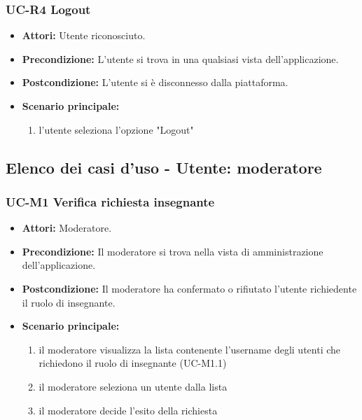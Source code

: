 \subsubsection{UC-R4 Logout}
\begin{itemize}
		\item \textbf{Attori:} Utente riconosciuto.
		\item \textbf{Precondizione:} L'utente si trova in una qualsiasi vista dell'applicazione.
		\item \textbf{Postcondizione:} L'utente si è disconnesso dalla piattaforma.
		\item \textbf{Scenario principale:}
		\begin{enumerate}
			\item l'utente seleziona l'opzione "Logout"
		\end{enumerate}
	\end{itemize}

\subsection{Elenco dei casi d'uso - Utente: moderatore}	
\subsubsection{UC-M1 Verifica richiesta insegnante}
		\begin{itemize}
			\item \textbf{Attori:} Moderatore.
			\item \textbf{Precondizione:} Il moderatore si trova nella vista di amministrazione dell'applicazione.
			\item \textbf{Postcondizione:} Il moderatore ha confermato o rifiutato l'utente richiedente il ruolo di insegnante.
			\item \textbf{Scenario principale:}
				\begin{enumerate}
					\item il moderatore visualizza la lista contenente l'username degli utenti che richiedono il ruolo di insegnante (UC-M1.1)
					\item il moderatore seleziona un utente dalla lista
					\item il moderatore decide l'esito della richiesta
				\end{enumerate}
		\end{itemize}	
		
